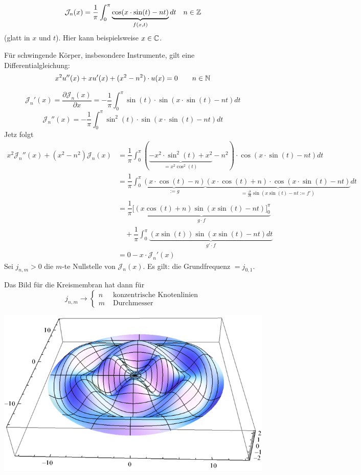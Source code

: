 \documentclass[main.tex]{subfiles}
\begin{document}
\begin{Beispiel}
  $$\mathcal{J}_n(x) = \dfrac{1}{\pi} \int_0^\pi \underbrace{\cos(x \cdot \sin(t) - nt)}_{f(x,t)} dt \quad n \in \mathbb{Z}$$
  (glatt in $x$ und $t$). Hier kann beispielsweise $x \in \mathbb{C}$.

  Für schwingende Körper, insbesondere Instrumente, gilt eine Differentialgleichung:
  $$x^2 u''(x) + x u'(x) + (x^2 - n^2)\cdot u(x) = 0 \qquad n \in \mathbb{N}$$

  $$\mathcal{J}_n'(x) = \dfrac{\partial \mathcal{J}_n(x)}{\partial x} = -\dfrac{1}{\pi} \int_0^\pi \sin(t) \cdot \sin(x \cdot \sin(t) - nt) dt$$
  $$\mathcal{J}_n''(x) = -\dfrac{1}{\pi}  \int_0^\pi \sin^2(t) \cdot \sin(x \cdot \sin(t) - nt) dt$$
  Jetz folgt
  $$\begin{aligned}
    x^2 \mathcal{J}_n''(x) + (x^2 - n^2)\mathcal{J}_n(x) & = \dfrac{1}{\pi} \int_0^\pi (\underbrace{-x^2\cdot \sin^2(t) + x^2}_{= x^2\cos^2(t)} - n^2)\cdot \cos(x \cdot \sin(t) -nt) dt \\
    & = \dfrac{1}{\pi} \int_0^\pi \underbrace{(x \cdot \cos(t) - n)}_{:= g} \underbrace{(x \cdot \cos(t) + n) \cdot \cos(x \cdot \sin(t) - nt)}_{=\frac{\partial}{\partial t} \sin(x\sin(t)-nt := f')} dt \\
    & = \dfrac{1}{\pi} \underbrace{\Big[(x \cos(t) + n)\sin(x \sin(t) - nt)\Big]_0^\pi}_{g \cdot f} \\
    & \quad + \dfrac{1}{\pi} \int_0^\pi \underbrace{(x \sin(t))\sin(x \sin(t) - nt) dt}_{g' \cdot f} \\
    & = 0 - x \cdot \mathcal{J}_n'(x)
  \end{aligned}$$
  Sei $j_{n,m} > 0$ die $m$-te Nullstelle von $\mathcal{J}_n(x)$. Es gilt: die Grundfrequenz $= j_{0,1}$.

  Das Bild für die Kreismembran hat dann für
  $$j_{n,m} \to \left\{ \begin{aligned}
    n & \text{ konzentrische Knotenlinien}\\
    m & \text{ Durchmesser}
  \end{aligned} \right.$$

  \begin{center}
    \includegraphics{./img/bessel_3d}


\end{center}
\end{Beispiel}
\end{document}
